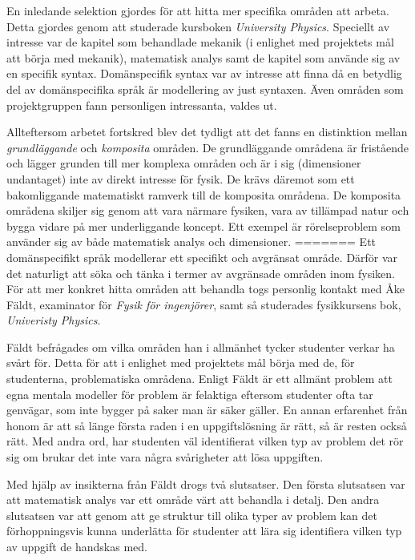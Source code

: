 \begin{binge}
En inledande selektion gjordes för att hitta mer specifika områden att arbeta.
Detta gjordes genom att studerade kursboken \textit{University Physics}.
Speciellt av intresse var de kapitel som behandlade mekanik (i enlighet med
projektets mål att börja med mekanik), matematisk analys samt de kapitel som
använde sig av en specifik syntax. Domänspecifik syntax var av intresse att
finna då en betydlig del av domänspecifika språk är modellering av just
syntaxen. Även områden som projektgruppen fann personligen intressanta, 
valdes ut.

Allteftersom arbetet fortskred blev det tydligt att det fanns en distinktion
mellan \textit{grundläggande} och \textit{komposita} områden. De grundläggande
områdena är fristående och lägger grunden till mer komplexa områden och är i sig
(dimensioner undantaget) inte av direkt intresse för fysik. De krävs däremot
som ett bakomliggande matematiskt ramverk till de komposita områdena. 
De komposita områdena skiljer sig genom att vara närmare fysiken, vara av
tillämpad natur och bygga vidare på mer underliggande koncept. Ett exempel är
rörelseproblem som använder sig av både matematisk analys och dimensioner.
=======
Ett domänspecifikt språk modellerar ett specifikt och avgränsat område. Därför var det naturligt att söka och tänka i termer av avgränsade områden inom fysiken. För att mer konkret hitta områden att behandla togs personlig kontakt med Åke Fäldt, examinator för \textit{Fysik för ingenjörer}, samt så studerades fysikkursens bok, \textit{Univeristy Physics}.

Fäldt befrågades om vilka områden han i allmänhet tycker studenter verkar ha svårt för. Detta för att i enlighet med projektets mål börja med de, för studenterna, problematiska områdena. Enligt Fäldt är ett allmänt problem att egna mentala modeller för problem är felaktiga eftersom studenter ofta tar genvägar, som inte bygger på saker man är säker gäller. En annan erfarenhet från honom är att så länge första raden i en uppgiftslösning är rätt, så är resten också rätt. Med andra ord, har studenten väl identifierat vilken typ av problem det rör sig om brukar det inte vara några svårigheter att lösa uppgiften.

Med hjälp av insikterna från Fäldt drogs två slutsatser. Den första slutsatsen var att matematisk analys var ett område värt att behandla i detalj. Den andra slutsatsen var att genom att ge struktur till olika typer av problem kan det förhoppningsvis kunna underlätta för studenter att lära sig identifiera vilken typ av uppgift de handskas med.


\end{binge}
